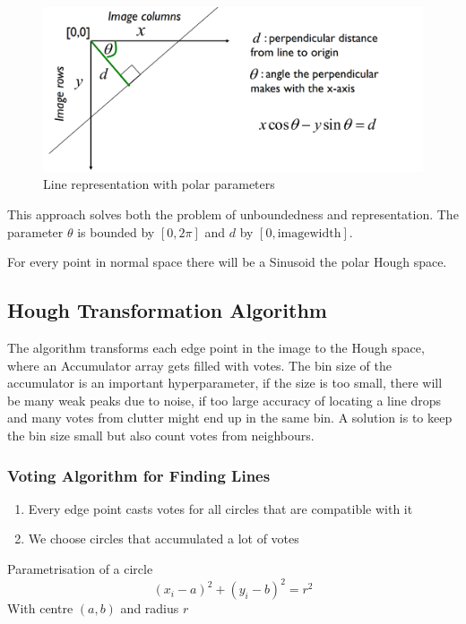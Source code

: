 \documentclass[x11names,11pt,a4paper]{article}
\theoremstyle{definition}
\begin{document}
\begin{figure}[H]
	\centering
	\includegraphics[width=0.8\linewidth]{img/line_representation_polar}
	\caption{Line representation with polar parameters}
	\label{fig:linerepresentationpolar}
\end{figure}

This approach solves both the problem of unboundedness and representation. The parameter $\theta$ is bounded by $[0,2\pi]$ and $d$ by $[0,\text{imagewidth}]$.

For every point in normal space there will be a Sinusoid the polar Hough space.

\subsection{Hough Transformation Algorithm}
The algorithm transforms each edge point in the image to the Hough space, where an Accumulator array gets filled with votes. The bin size of the accumulator is an important hyperparameter, if the size is too small, there will be many weak peaks due to noise, if too large accuracy of locating a line drops and many votes from clutter might end up in the same bin. A solution is to keep the bin size small but also count votes from neighbours.

\subsubsection{Voting Algorithm for Finding Lines}
\begin{enumerate}
	\item Every edge point casts votes for all circles that are compatible with it
	\item We choose circles that accumulated a lot of votes
\end{enumerate}

\begin{theorem}
	Parametrisation of a circle
	\begin{equation*}
		(x_i - a)^2 + (y_i - b)^2 = r^2
	\end{equation*}
	With centre $(a,b)$ and radius $r$
\end{theorem}
\end{document}
